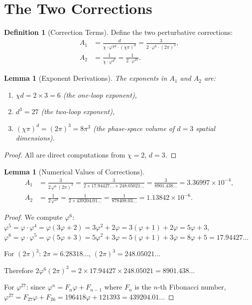 \documentclass[11pt,a4paper]{article}
\theoremstyle{plain}
\newtheorem{lemma}[theorem]{Lemma}
\theoremstyle{definition}
\newtheorem{definition}[theorem]{Definition}
\newcommand{\vp}{\varphi}
\begin{document}
\section{The Two Corrections}\label{sec:corrections}

\begin{definition}[Correction Terms]\label{def:corrections}
Define the two perturbative corrections:
\begin{align}
  A_1 &= \frac{d}{\chi \cdot \vp^{\chi d} \cdot (\chi\pi)^d}
       = \frac{3}{2 \cdot \vp^6 \cdot (2\pi)^3}, \label{eq:A1} \\
  A_2 &= \frac{1}{\chi \cdot \vp^{d^3}}
       = \frac{1}{2 \cdot \vp^{27}}. \label{eq:A2}
\end{align}
\end{definition}

\begin{lemma}[Exponent Derivations]\label{lem:exponents}
The exponents in $A_1$ and $A_2$ are:
\begin{enumerate}[nosep]
  \item $\chi d = 2 \times 3 = 6$ (the one-loop exponent),
  \item $d^3 = 27$ (the two-loop exponent),
  \item $(\chi\pi)^d = (2\pi)^3 = 8\pi^3$ (the phase-space volume
    of $d=3$ spatial dimensions).
\end{enumerate}
\end{lemma}

\begin{proof}
All are direct computations from $\chi = 2$, $d = 3$.
\end{proof}

\begin{lemma}[Numerical Values of Corrections]\label{lem:correction-values}
\begin{align*}
  A_1 &= \frac{3}{2\,\vp^6\,(2\pi)^3}
       = \frac{3}{2 \times 17.94427\ldots \times 248.05021\ldots}
       = \frac{3}{8901.438\ldots}
       = 3.36997 \times 10^{-4}, \\
  A_2 &= \frac{1}{2\,\vp^{27}}
       = \frac{1}{2 \times 439204.01\ldots}
       = \frac{1}{878408.03\ldots}
       = 1.13842 \times 10^{-6}.
\end{align*}
\end{lemma}

\begin{proof}
We compute $\vp^6$:
$\vp^5 = \vp \cdot \vp^4 = \vp(3\vp+2) = 3\vp^2 + 2\vp = 3(\vp+1)+2\vp = 5\vp+3$,
$\vp^6 = \vp \cdot \vp^5 = \vp(5\vp+3) = 5\vp^2+3\vp = 5(\vp+1)+3\vp = 8\vp+5 = 17.94427\ldots$

For $(2\pi)^3$: $2\pi = 6.28318\ldots$, $(2\pi)^3 = 248.05021\ldots$

Therefore $2\vp^6(2\pi)^3 = 2 \times 17.94427 \times 248.05021 = 8901.438\ldots$

For $\vp^{27}$: since $\vp^n = F_n\vp + F_{n-1}$ where $F_n$ is the
$n$-th Fibonacci number, $\vp^{27} = F_{27}\vp + F_{26} = 196418\vp + 121393
= 439204.01\ldots$
\end{proof}
\end{document}
